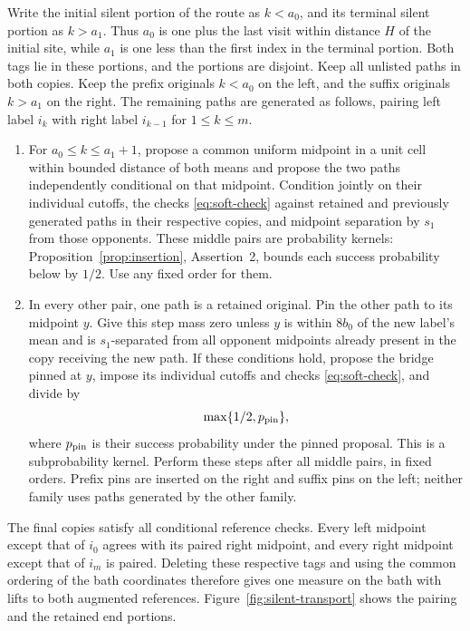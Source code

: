 Write the initial silent portion of the route as $k<a_0$, and its
terminal silent portion as $k>a_1$.  Thus $a_0$ is one plus the last
visit within distance $H$ of the initial site, while $a_1$ is one less
than the first index in the terminal portion.  Both tags lie in these
portions, and the portions are disjoint.  Keep all unlisted paths in
both copies.  Keep the prefix originals $k<a_0$ on the left, and the
suffix originals $k>a_1$ on the right.  The remaining paths are
generated as follows, pairing left label $i_k$ with right label
$i_{k-1}$ for $1\le k\le m$.

\begin{enumerate}
\item For $a_0\le k\le a_1+1$, propose a common uniform midpoint
in a unit cell within bounded distance of both means and propose the
two paths independently conditional on that midpoint.  Condition
jointly on their individual cutoffs, the checks
\eqref{eq:soft-check} against retained and previously generated paths
in their respective copies, and midpoint separation by $s_1$ from
those opponents.  These middle pairs are probability kernels:
Proposition~\ref{prop:insertion}, Assertion~2, bounds each success
probability below by $1/2$.  Use any fixed order for them.

\item In every other pair, one path is a retained original.  Pin the
other path to its midpoint $y$.  Give this step mass zero unless $y$
is within $8b_0$ of the new label's mean and is $s_1$-separated from
all opponent midpoints already present in the copy receiving the
new path.  If these conditions hold, propose the bridge pinned at
$y$, impose its individual cutoffs and checks
\eqref{eq:soft-check}, and divide by
\begin{equation}\label{eq:pin-denominator}
 \max\{1/2,p_{\rm pin}\},
\end{equation}
where $p_{\rm pin}$ is their success probability under the pinned
proposal.  This is a subprobability kernel.  Perform these steps
after all middle pairs, in fixed orders.  Prefix pins are inserted
on the right and suffix pins on the left; neither family uses paths
generated by the other family.
\end{enumerate}

The final copies satisfy all conditional reference checks.  Every
left midpoint except that of $i_0$ agrees with its paired right
midpoint, and every right midpoint except that of $i_m$ is paired.
Deleting these respective tags and using the common ordering of the
bath coordinates therefore gives one measure on the bath with lifts
to both augmented references.  Figure~\ref{fig:silent-transport}
shows the pairing and the retained end portions.

